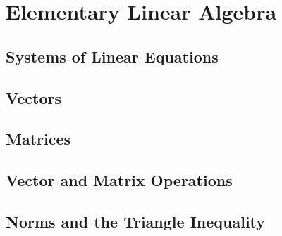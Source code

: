 \chapter{Elementary Linear Algebra}\label{chap:elementary linear algebra}

\section{Systems of Linear Equations}

\section{Vectors}

\section{Matrices}

\section{Vector and Matrix Operations}

\section{Norms and the Triangle Inequality}

